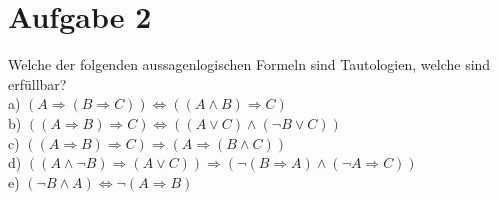 \section*{Aufgabe 2}

Welche der folgenden aussagenlogischen Formeln sind Tautologien, welche sind erfüllbar?\\

a) $(A \Rightarrow (B \Rightarrow C)) \Leftrightarrow ((A \land B) \Rightarrow C)$\\

b) $((A \Rightarrow B) \Rightarrow C) \Leftrightarrow ((A \lor C) \land (\lnot B \lor C))$\\

c) $((A \Rightarrow B) \Rightarrow C) \Rightarrow (A \Rightarrow (B \land C))$\\

d) $((A \land \lnot B) \Rightarrow (A \lor C)) \Rightarrow (\lnot (B \Rightarrow A) \land (\lnot A \Rightarrow C))$\\

e) $(\lnot B \land A) \Leftrightarrow \lnot (A \Rightarrow B)$\\